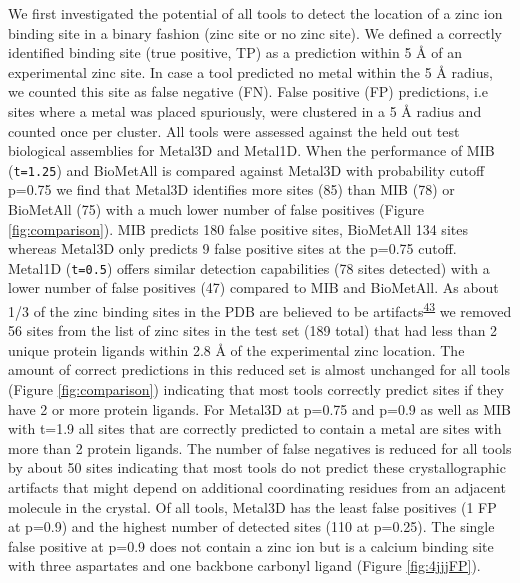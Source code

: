 \documentclass[  ASAPversion,
  ,
  9pt]{elife}
\begin{document}
We first investigated the potential of all tools to detect the location of a zinc ion binding site in a binary fashion (zinc site or no zinc site). We defined a correctly identified binding site (true positive, TP) as a prediction within 5 Å of an experimental zinc site. In case a tool predicted no metal within the 5 Å radius, we counted this site as false negative (FN). False positive (FP) predictions, i.e sites where a metal was placed spuriously, were clustered in a 5 Å radius and counted once per cluster. All tools were assessed against the held out test biological assemblies for Metal3D and Metal1D. When the performance of MIB (\texttt{t=1.25}) and BioMetAll is compared against Metal3D with probability cutoff p=0.75 we find that Metal3D identifies more sites (85) than MIB (78) or BioMetAll (75) with a much lower number of false positives (Figure \ref{fig:comparison}).
MIB predicts 180 false positive sites, BioMetAll 134 sites whereas Metal3D only predicts 9 false positive sites at the p=0.75 cutoff. Metal1D (\texttt{t=0.5}) offers similar detection capabilities (78 sites detected) with a lower number of false positives (47) compared to MIB and BioMetAll.
As about 1/3 of the zinc binding sites in the PDB are believed to be artifacts\textsuperscript{\protect\hyperlink{ref-Wt0ducot}{43}} we removed 56 sites from the list of zinc sites in the test set (189 total) that had less than 2 unique protein ligands within 2.8 Å of the experimental zinc location. The amount of correct predictions in this reduced set is almost unchanged for all tools (Figure \ref{fig:comparison}) indicating that most tools correctly predict sites if they have 2 or more protein ligands. For Metal3D at p=0.75 and p=0.9 as well as MIB with t=1.9 all sites that are correctly predicted to contain a metal are sites with more than 2 protein ligands. The number of false negatives is reduced for all tools by about 50 sites indicating that most tools do not predict these crystallographic artifacts that might depend on additional coordinating residues from an adjacent molecule in the crystal. Of all tools, Metal3D has the least false positives (1 FP at p=0.9) and the highest number of detected sites (110 at p=0.25). The single false positive at p=0.9 does not contain a zinc ion but is a calcium binding site with three aspartates and one backbone carbonyl ligand (Figure \ref{fig:4jjjFP}).
\end{document}
